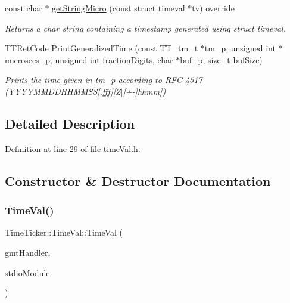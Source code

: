 \begin{DoxyCompactItemize}
const char $\ast$ \mbox{\hyperlink{classTimeTicker_1_1TimeVal_ae62b5b5a2ddd13f44394a4ef62c4a5d7}{get\+String\+Micro}} (const struct timeval $\ast$tv) override
\begin{DoxyCompactList}\small\item\em Returns a char string containing a timestamp generated using struct timeval. \end{DoxyCompactList}\item 
T\+T\+Ret\+Code \mbox{\hyperlink{classTimeTicker_1_1TimeVal_a1f3e870f512f586fd529173c0cf47874}{Print\+Generalized\+Time}} (const T\+T\+\_\+tm\+\_\+t $\ast$tm\+\_\+p, unsigned int $\ast$microsecs\+\_\+p, unsigned int fraction\+Digits, char $\ast$buf\+\_\+p, size\+\_\+t buf\+Size)
\begin{DoxyCompactList}\small\item\em Prints the time given in tm\+\_\+p according to R\+FC 4517 (Y\+Y\+Y\+Y\+M\+M\+D\+D\+H\+H\+M\+M\+SS\mbox{[}.fff\mbox{]}\mbox{[}Z$\vert$\mbox{[}+-\/\mbox{]}hhmm\mbox{]}) \end{DoxyCompactList}\end{DoxyCompactItemize}


\subsection{Detailed Description}


Definition at line 29 of file time\+Val.\+h.



\subsection{Constructor \& Destructor Documentation}
\mbox{\label{classTimeTicker_1_1TimeVal_a21338e34d06fba75217223f8239c2c20}} 
\subsubsection{\texorpdfstring{TimeVal()}{TimeVal()}}
{\footnotesize\ttfamily Time\+Ticker\+::\+Time\+Val\+::\+Time\+Val (\begin{DoxyParamCaption}\item[{std\+::unique\+\_\+ptr$<$ \mbox{\hyperlink{classTimeTicker_1_1I__gMTHandler}{I\+\_\+g\+M\+T\+Handler}} $>$}]{gmt\+Handler,  }\item[{std\+::unique\+\_\+ptr$<$ \mbox{\hyperlink{classcFunctions_1_1I__cStdio}{c\+Functions\+::\+I\+\_\+c\+Stdio}} $>$}]{stdio\+Module }\end{DoxyParamCaption})}



